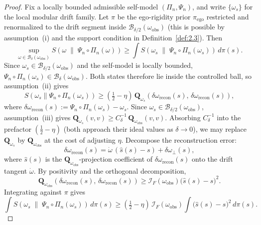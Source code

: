 \documentclass[12pt]{article}
\theoremstyle{definition}
\theoremstyle{remark}
\begin{document}
\begin{proof}
Fix a locally bounded admissible self-model \((\Pi_n,\Psi_n)\), and
write \(\{\omega_s\}\) for the local modular drift family. Let
\(\pi\) be the ego-rigidity prior \(\pi_{\mathrm{ego}}\) restricted
and renormalized to the drift segment inside
\(\mathcal{B}_{\delta/2}(\omega_{\mathrm{obs}})\) (this is possible by
assumption~(i) and the support condition in
Definition~\ref{def:2.3}). Then
\[
\sup_{\omega\in \mathcal{B}_\delta(\omega_{\mathrm{obs}})}
S\!\left(
\omega\;\middle\|\;\Psi_n\circ\Pi_n(\omega)
\right)
\ge
\int
S\!\left(
\omega_s\;\middle\|\;\Psi_n\circ\Pi_n(\omega_s)
\right)\,d\pi(s).
\]
Since \(\omega_s\in\mathcal{B}_{\delta/2}(\omega_{\mathrm{obs}})\)
and the self-model is locally bounded,
\(\Psi_n\circ\Pi_n(\omega_s)\in
\mathcal{B}_\delta(\omega_{\mathrm{obs}})\). Both states therefore
lie inside the controlled ball, so assumption~(ii) gives
\[
S(\omega_s\|\Psi_n\circ\Pi_n(\omega_s))
\ge
(\tfrac{1}{2}-\eta)\,
\mathbf{Q}_{\omega_s}(\delta\omega_{\mathrm{recon}}(s),\,
\delta\omega_{\mathrm{recon}}(s)),
\]
where
\(\delta\omega_{\mathrm{recon}}(s):=
\Psi_n\circ\Pi_n(\omega_s)-\omega_s\).
Since \(\omega_s\in\mathcal{B}_{\delta/2}(\omega_{\mathrm{obs}})\),
assumption~(iii) gives
\(\mathbf{Q}_{\omega_s}(v,v)\ge C_\delta^{-1}\,
\mathbf{Q}_{\omega_{\mathrm{obs}}}(v,v)\). Absorbing
\(C_\delta^{-1}\) into the prefactor \((\tfrac{1}{2}-\eta)\) (both
approach their ideal values as \(\delta\to 0\)), we may replace
\(\mathbf{Q}_{\omega_s}\) by
\(\mathbf{Q}_{\omega_{\mathrm{obs}}}\) at the cost of adjusting
\(\eta\). Decompose the reconstruction error:
\[
\delta\omega_{\mathrm{recon}}(s)
=
\dot{\omega}\,(\widehat{s}(s)-s)
+
\delta\omega_{\perp}(s),
\]
where \(\widehat{s}(s)\) is the
\(\mathbf{Q}_{\omega_{\mathrm{obs}}}\)-projection coefficient of
\(\delta\omega_{\mathrm{recon}}(s)\) onto the drift tangent
\(\dot{\omega}\).
By positivity and the orthogonal decomposition,
\[
\mathbf{Q}_{\omega_{\mathrm{obs}}}(\delta\omega_{\mathrm{recon}}(s),\,
\delta\omega_{\mathrm{recon}}(s))
\ge
\mathcal{I}_F(\omega_{\mathrm{obs}})
\bigl(\widehat{s}(s)-s\bigr)^2.
\]
Integrating against \(\pi\) gives
\[
\int
S\!\left(
\omega_s\;\middle\|\;\Psi_n\circ\Pi_n(\omega_s)
\right)\,d\pi(s)
\ge
(\tfrac{1}{2}-\eta)\,\mathcal{I}_F(\omega_{\mathrm{obs}})
\int\bigl(\widehat{s}(s)-s\bigr)^2\,d\pi(s).
\]


\end{proof}
\end{document}
